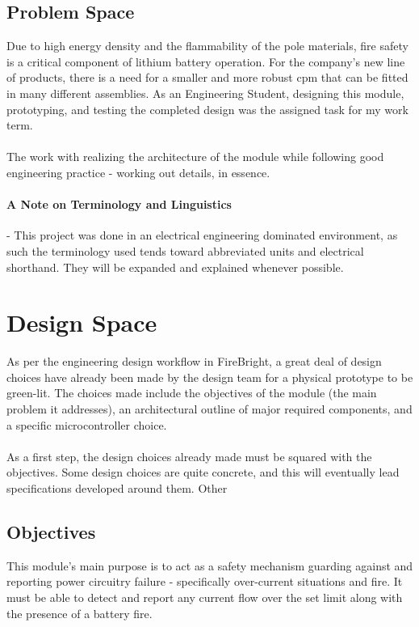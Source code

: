 \documentclass[12pt]{article}
\begin{document}
	\subsection{Problem Space}
	Due to high energy density and the flammability of the pole materials, fire safety is a critical component of lithium battery operation. For the company's new line of products, there is a need for a smaller and more robust \acrfull{cpm} that can be fitted in many different assemblies. As an Engineering Student, designing this module, prototyping, and testing the completed design was the assigned task for my work term.
	
    \paragraph{}
	The work with realizing the architecture of the module while following good engineering practice - working out details, in essence.

  \paragraph{A Note on Terminology and Linguistics} - This project was done in an electrical engineering dominated environment, as such the terminology used tends toward abbreviated units and electrical shorthand. They will be expanded and explained whenever possible.
  
  \section{Design Space}
  As per the engineering design workflow in FireBright, a great deal of design choices have already been made by the design team for a physical prototype to be green-lit. The choices made include the objectives of the module (the main problem it addresses), an architectural outline of major required components, and a specific microcontroller choice.

  \paragraph{}
  As a first step, the design choices already made must be squared with the objectives. Some design choices are quite concrete, and this will eventually lead specifications developed around them. Other

  \subsection{Objectives}
  This module's main purpose is to act as a safety mechanism guarding against and reporting power circuitry failure - specifically over-current situations and fire. It must be able to detect and report any current flow over the set limit along with the presence of a battery fire.
\end{document}
